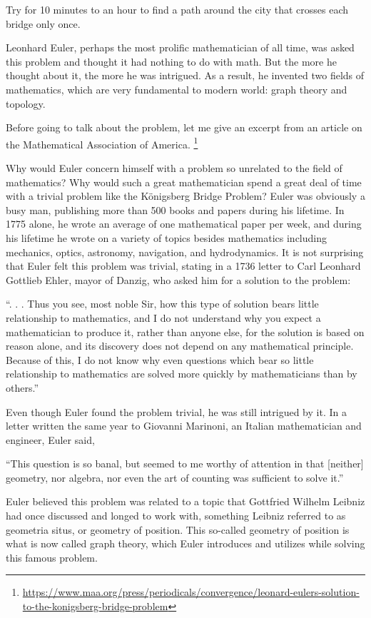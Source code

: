 \begin{question}
    Try for 10 minutes to an hour to find a path around the city that crosses each
    bridge only once.
\end{question}

Leonhard Euler, perhaps the most prolific mathematician of all time, was asked this problem and 
thought it had nothing to do with math. But the more he thought about it, the more he was intrigued.
As a result, he invented two fields of mathematics, which are very fundamental to modern world: graph theory and topology.


Before going to talk about the problem, let me give an excerpt from an 
article on the Mathematical Association of America.
\footnote{
\url{https://www.maa.org/press/periodicals/convergence/leonard-eulers-solution-to-the-konigsberg-bridge-problem}
}

\begin{displayquote}
   Why would Euler concern himself with a problem so unrelated to the field of mathematics?  Why would such a great mathematician spend a great deal of time with a trivial problem like the Königsberg Bridge Problem?  Euler was obviously a busy man, publishing more than 500 books and papers during his lifetime.  In 1775 alone, he wrote an average of one mathematical paper per week, and during his lifetime he wrote on a variety of topics besides mathematics including mechanics, optics, astronomy, navigation, and hydrodynamics.  It is not surprising that Euler felt this problem was trivial, stating in a 1736 letter to Carl Leonhard Gottlieb Ehler, mayor of Danzig, who asked him for a solution to the problem:

    ``. . .  Thus you see, most noble Sir, how this type of solution bears little relationship to mathematics, and I do not understand why you expect a mathematician to produce it, rather than anyone else, for the solution is based on reason alone, and its discovery does not depend on any mathematical principle.  Because of this, I do not know why even questions which bear so little relationship to mathematics are solved more quickly by mathematicians than by others.''

Even though Euler found the problem trivial, he was still intrigued by it.  In a letter written the same year to Giovanni Marinoni, an Italian mathematician and engineer, Euler said,

    ``This question is so banal, but seemed to me worthy of attention in that [neither] geometry, nor algebra, nor even the art of counting was sufficient to solve it.''

Euler believed this problem was related to a topic that Gottfried Wilhelm Leibniz had once discussed and longed to work with, something Leibniz referred to as geometria situs, or geometry of position.  This so-called geometry of position is what is now called graph theory, which Euler introduces and utilizes while solving this famous problem. 
\end{displayquote}

